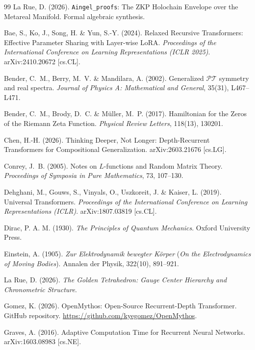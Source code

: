 \vspace{2em}
\begin{thebibliography}{99}
La Rue, D. (2026).
\texttt{Aingel\_proofs}: The ZKP Holochain Envelope over the Metareal Manifold.
Formal algebraic synthesis.

Bae, S., Ko, J., Song, H. \& Yun, S.-Y. (2024).
Relaxed Recursive Transformers: Effective Parameter Sharing with Layer-wise LoRA.
\textit{Proceedings of the International Conference on Learning Representations (ICLR 2025)}.
arXiv:2410.20672 [cs.CL].

Bender, C.~M., Berry, M.~V. \& Mandilara, A. (2002).
Generalized $\mathcal{PT}$ symmetry and real spectra.
\textit{Journal of Physics A: Mathematical and General}, 35(31), L467--L471.

Bender, C.~M., Brody, D.~C. \& M\"uller, M.~P. (2017).
Hamiltonian for the Zeros of the Riemann Zeta Function.
\textit{Physical Review Letters}, 118(13), 130201.

Chen, H.-H. (2026).
Thinking Deeper, Not Longer: Depth-Recurrent Transformers for Compositional Generalization.
arXiv:2603.21676 [cs.LG].

Conrey, J.~B. (2005).
Notes on $L$-functions and Random Matrix Theory.
\textit{Proceedings of Symposia in Pure Mathematics}, 73, 107--130.

Dehghani, M., Gouws, S., Vinyals, O., Uszkoreit, J. \& Kaiser, L. (2019).
Universal Transformers.
\textit{Proceedings of the International Conference on Learning Representations (ICLR)}.
arXiv:1807.03819 [cs.CL].

Dirac, P. A. M. (1930).
\textit{The Principles of Quantum Mechanics}.
Oxford University Press.

Einstein, A. (1905).
\textit{Zur Elektrodynamik bewegter Körper} (\textit{On the Electrodynamics of Moving Bodies}).
Annalen der Physik, 322(10), 891--921.

La Rue, D. (2026).
\textit{The Golden Tetrahedron: Gauge Center Hierarchy and Chronometric Structure}.

Gomez, K. (2026).
OpenMythos: Open-Source Recurrent-Depth Transformer.
GitHub repository. \url{https://github.com/kyegomez/OpenMythos}.

Graves, A. (2016).
Adaptive Computation Time for Recurrent Neural Networks.
arXiv:1603.08983 [cs.NE].


\end{thebibliography}
